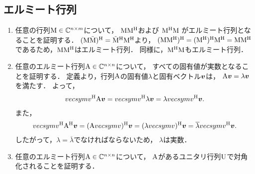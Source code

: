 \subsection{エルミート行列}
  \begin{enumerate}[label=(\roman*)]
    \item 任意の行列$\mathrm{M} \in \mathbb{C}^{n \times m}$について，
      $\mathrm{M}\mathrm{M}^\mathrm{H}$および
      $\mathrm{M}^\mathrm{H}\mathrm{M}$
      がエルミート行列となることを証明する．
      $(\mathrm{M}\tilde{\mathrm{M}})^\mathrm{H} = \tilde{\mathrm{M}}^\mathrm{H}\mathrm{M}^\mathrm{H}$より，
      $(\mathrm{M}\mathrm{M}^\mathrm{H})^\mathrm{H} = (\mathrm{M}^\mathrm{H})^\mathrm{H}\mathrm{M}^\mathrm{H} = \mathrm{M}\mathrm{M}^\mathrm{H}$
      であるため，$\mathrm{M}\mathrm{M}^\mathrm{H}$はエルミート行列．
      同様に，$\mathrm{M}^\mathrm{H}\mathrm{M}$もエルミート行列．
      
    \item 任意のエルミート行列$\mathrm{A} \in \mathbb{C}^{n \times n}$について，
      すべての固有値が実数となることを証明する．
      定義より，行列$\mathrm{A}$の固有値$\lambda$と固有ベクトル$\boldsymbol{v}$は，
      $\mathrm{A}\boldsymbol{v} = \lambda \boldsymbol{v}$を満たす．
      よって，
      \begin{align}
        vecsym{v}^\mathrm{H} \mathrm{A} \boldsymbol{v}
        = vecsym{v}^\mathrm{H} \lambda \boldsymbol{v}
        = \lambda vecsym{v}^\mathrm{H} \boldsymbol{v}.
      \end{align}
      また，
      \begin{align}
        vecsym{v}^\mathrm{H} \mathrm{A}^\mathrm{H} \boldsymbol{v}
        = (\mathrm{A} vecsym{v})^\mathrm{H} \boldsymbol{v}
        = (\lambda vecsym{v})^\mathrm{H} \boldsymbol{v}
        = \overline{\lambda} vecsym{v}^\mathrm{H} \boldsymbol{v}.
      \end{align}
      したがって，$\lambda = \overline{\lambda}$でなければならないため，
      $\lambda$は実数．
    
    \item 任意のエルミート行列$\mathrm{A} \in \mathbb{C}^{n \times n}$について，
      $\mathrm{A}$があるユニタリ行列$\mathrm{U}$で対角化されることを証明する．
      
  \end{enumerate}

  \clearpage
